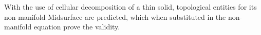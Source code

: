 With the use of cellular decomposition of a thin solid, topological entities for its non-manifold Midsurface are predicted, which when substituted in the non-manifold equation prove the validity.

%
%
